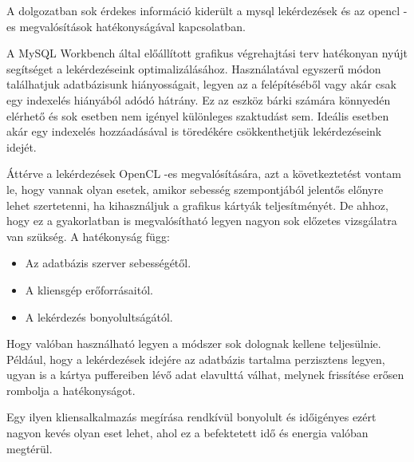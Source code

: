 
A dolgozatban sok érdekes információ kiderült a mysql lekérdezések és az opencl -es megvalósítások hatékonyságával kapcsolatban.

A MySQL Workbench által előállított grafikus végrehajtási terv hatékonyan nyújt segítséget a lekérdezéseink optimalizálásához. Használatával egyszerű módon találhatjuk adatbázisunk hiányosságait, legyen az a felépítéséből vagy akár csak egy indexelés hiányából adódó hátrány. Ez az eszköz bárki számára könnyedén elérhető és sok esetben nem igényel különleges szaktudást sem. Ideális esetben akár egy indexelés hozzáadásával is töredékére csökkenthetjük lekérdezéseink idejét.

Áttérve a lekérdezések OpenCL -es megvalósítására, azt a következtetést vontam le, hogy vannak olyan esetek, amikor sebesség szempontjából jelentős előnyre lehet szertetenni, ha kihasználjuk a grafikus kártyák teljesítményét. De ahhoz, hogy ez a gyakorlatban is megvalósítható legyen nagyon sok előzetes vizsgálatra van szükség. A hatékonyság függ:
\begin{itemize}
\item Az adatbázis szerver sebességétől.
\item A kliensgép erőforrásaitól.
\item A lekérdezés bonyolultságától.
\end{itemize}
Hogy valóban használható legyen a módszer sok dolognak kellene teljesülnie.
Például, hogy a lekérdezések idejére az adatbázis tartalma perzisztens legyen, ugyan is a kártya puffereiben lévő adat elavulttá válhat, melynek frissítése erősen rombolja a hatékonyságot. 

Egy ilyen kliensalkalmazás megírása rendkívül bonyolult és időigényes ezért nagyon kevés olyan eset lehet, ahol ez a befektetett idő és energia valóban megtérül. 







